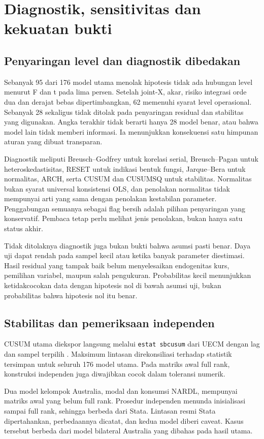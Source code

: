 \section{Diagnostik, sensitivitas dan kekuatan bukti}\label{sec:diagnostics}
\subsection{Penyaringan level dan diagnostik dibedakan}
Sebanyak 95 dari 176 model utama menolak hipotesis tidak ada hubungan level menurut F dan t pada lima persen. Setelah joint-X, akar, risiko integrasi orde dua dan derajat bebas dipertimbangkan, 62 memenuhi syarat level operasional. Sebanyak 28 sekaligus tidak ditolak pada penyaringan residual dan stabilitas yang digunakan. Angka terakhir tidak berarti hanya 28 model benar, atau bahwa model lain tidak memberi informasi. Ia menunjukkan konsekuensi satu himpunan aturan yang dibuat transparan.

Diagnostik meliputi Breusch--Godfrey untuk korelasi serial, Breusch--Pagan untuk heteroskedastisitas, RESET untuk indikasi bentuk fungsi, Jarque--Bera untuk normalitas, ARCH, serta CUSUM dan CUSUMSQ untuk stabilitas. Normalitas bukan syarat universal konsistensi OLS, dan penolakan normalitas tidak mempunyai arti yang sama dengan penolakan kestabilan parameter. Penggabungan semuanya sebagai flag bersih adalah pilihan penyaringan yang konservatif. Pembaca tetap perlu melihat jenis penolakan, bukan hanya satu status akhir.

Tidak ditolaknya diagnostik juga bukan bukti bahwa asumsi pasti benar. Daya uji dapat rendah pada sampel kecil atau ketika banyak parameter diestimasi. Hasil residual yang tampak baik belum menyelesaikan endogenitas kurs, pemilihan variabel, maupun salah pengukuran. Probabilitas kecil menunjukkan ketidakcocokan data dengan hipotesis nol di bawah asumsi uji, bukan probabilitas bahwa hipotesis nol itu benar.

\subsection{Stabilitas dan pemeriksaan independen}
CUSUM utama diekspor langsung melalui \texttt{estat sbcusum} dari UECM dengan lag dan sampel terpilih \cite{stata}. Maksimum lintasan direkonsiliasi terhadap statistik tersimpan untuk seluruh 176 model utama. Pada matriks awal full rank, konstruksi independen juga diwajibkan cocok dalam toleransi numerik.

Dua model kelompok Australia, modal dan konsumsi NARDL, mempunyai matriks awal yang belum full rank. Prosedur independen menunda inisialisasi sampai full rank, sehingga berbeda dari Stata. Lintasan resmi Stata dipertahankan, perbedaannya dicatat, dan kedua model diberi caveat. Kasus tersebut berbeda dari model bilateral Australia yang dibahas pada hasil utama.

